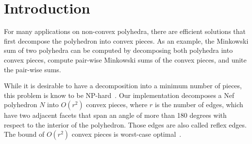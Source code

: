 
\ccParDims




\section{Introduction}

For many applications on non-convex polyhedra, there are efficient
solutions that first decompose the polyhedron into convex pieces. As
an example, the Minkowski sum of two polyhedra can be computed by
decomposing both polyhedra into convex pieces, compute pair-wise
Minkowski sums of the convex pieces, and unite the pair-wise sums.

While it is desirable to have a decomposition into a minimum number of
pieces, this problem is know to be NP-hard~\cite{c-cpplb-84}. Our
implementation decomposes a Nef polyhedron $N$ into $O(r^2)$ convex
pieces, where $r$ is the number of edges, which have two adjacent
facets that span an angle of more than 180 degrees with respect to the
interior of the polyhedron. Those edges are also called reflex edges.
The bound of $O(r^2)$ convex pieces is worst-case
optimal~\cite{c-cpplb-84}.

